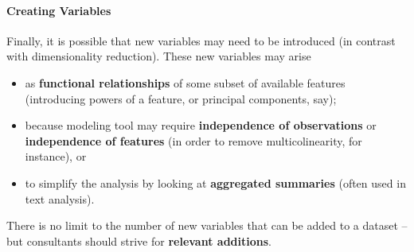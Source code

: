 \paragraph{Creating Variables} Finally, it is possible that new variables may need to be introduced (in contrast with dimensionality reduction). These new variables may arise
\begin{itemize}[noitemsep]
\item as \textbf{functional relationships} of some subset of available features (introducing powers of a feature, or principal components, say);
\item because modeling tool may require \textbf{independence of observations} or \textbf{independence of features} (in order to remove multicolinearity, for instance), or 
\item to simplify the analysis by looking at \textbf{aggregated summaries} (often used in text analysis).
\end{itemize}
There is no limit to the number of new variables that can be added to a dataset -- but consultants should strive for \textbf{relevant additions}.
